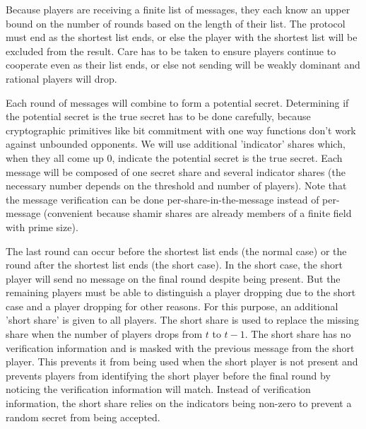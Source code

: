 \documentclass{dalcsthesis}
\begin{document}
Because players are receiving a finite list of messages, they each know an upper bound on the number of rounds based on the length of their list. The protocol must end as the shortest list ends, or else the player with the shortest list will be excluded from the result. Care has to be taken to ensure players continue to cooperate even as their list ends, or else not sending will be weakly dominant and rational players will drop.

Each round of messages will combine to form a potential secret. Determining if the potential secret is the true secret has to be done carefully, because cryptographic primitives like bit commitment with one way functions don't work against unbounded opponents. We will use additional 'indicator' shares which, when they all come up 0, indicate the potential secret is the true secret. Each message will be composed of one secret share and several indicator shares (the necessary number depends on the threshold and number of players). Note that the message verification can be done per-share-in-the-message instead of per-message (convenient because shamir shares are already members of a finite field with prime size). 

The last round can occur before the shortest list ends (the normal case) or the round after the shortest list ends (the short case). In the short case, the short player will send no message on the final round despite being present. But the remaining players must be able to distinguish a player dropping due to the short case and a player dropping for other reasons. For this purpose, an additional 'short share' is given to all players. The short share is used to replace the missing share when the number of players drops from $t$ to $t-1$. The short share has no verification information and is masked with the previous message from the short player. This prevents it from being used when the short player is not present and prevents players from identifying the short player before the final round by noticing the verification information will match. Instead of verification information, the short share relies on the indicators being non-zero to prevent a random secret from being accepted.
\end{document}
